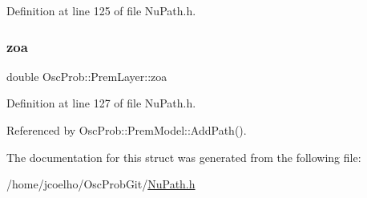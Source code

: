 Definition at line 125 of file Nu\+Path.\+h.

\mbox{\label{structOscProb_1_1PremLayer_a8687a8169d786fca79908292d11077f5}} 
\subsubsection{\texorpdfstring{zoa}{zoa}}
{\footnotesize\ttfamily double Osc\+Prob\+::\+Prem\+Layer\+::zoa}



Definition at line 127 of file Nu\+Path.\+h.



Referenced by Osc\+Prob\+::\+Prem\+Model\+::\+Add\+Path().



The documentation for this struct was generated from the following file\+:\begin{DoxyCompactItemize}
\item 
/home/jcoelho/\+Osc\+Prob\+Git/\hyperlink{NuPath_8h}{Nu\+Path.\+h}\end{DoxyCompactItemize}
